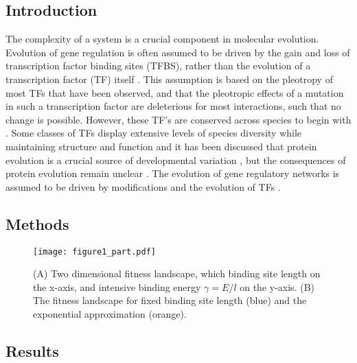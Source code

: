 \documentclass[10pt,a4paper]{article}
\begin{document}
	\subsection*{Introduction}
	The complexity of a system is a crucial component in molecular evolution. Evolution of gene regulation is often assumed to be driven by the gain and loss of transcription factor binding sites (TFBS), rather than the evolution of a transcription factor (TF) itself \cite{dynamics2015}. This assumption is based on the pleotropy of most TFs that have been observed, and that the pleotropic effects of a mutation in such a transcription factor are deleterious for most interactions, such that no change is possible. However, these TF's are conserved across species to begin with \cite{schmidt2010five}. Some classes of TFs display extensive levels of species diversity while maintaining structure and function\cite{Nowick2010} and it has been discussed that protein evolution is a crucial source of developmental variation \cite{lynch2008resurrecting}, but the consequences of protein evolution remain unclear \cite{WAGNER2008377, Voordeckers2015}. The evolution of gene regulatory networks is assumed to be driven by modifications 
	and the evolution of TFs \cite{chavez2006, perez2009}.
	
	\subsection*{Methods}
	

	\begin{figure}
		\texttt{[image: figure1\_part.pdf]}\caption{(A) Two dimensional fitness landscape, which binding site length on the x-axis, and intensive binding energy $\gamma=E/l$ on the y-axis. (B) The fitness landscape for fixed binding site length (blue) and the exponential approximation (orange).}\label{fig1}
	\end{figure}

	\subsection*{Results}
\end{document}
